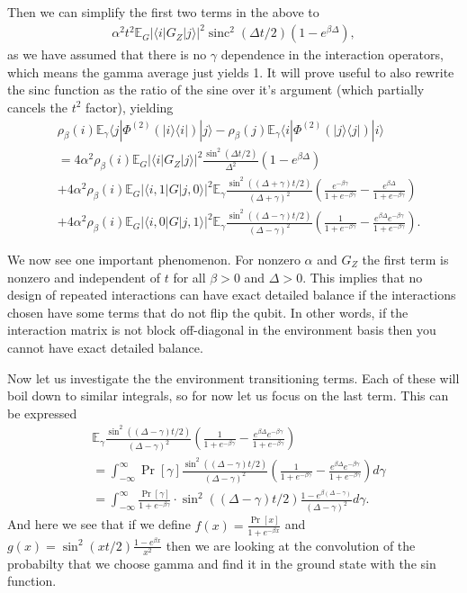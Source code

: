 \documentclass[
 amsmath,amssymb,
 aps,
onecolumn, 
nofootinbib]{revtex4-2}
\newcommand{\ket}[1]{|#1\rangle}
\newcommand{\bra}[1]{\langle #1|}
\newcommand{\ketbra}[2]{| #1\rangle\! \langle #2|}
\newcommand{\abs}[1]{\left| #1 \right|}
\newcommand{\EE}{\mathbb{E}}
\DeclareMathOperator{\sinc}{sinc}
\begin{document}
Then we can simplify the first two terms in the above to
\begin{align}
    \alpha^2 t^2 \EE_G \abs{\bra{i} G_Z \ket{j}}^2 \sinc^2 (\Delta t /2) (1 - e^{\beta \Delta}),
\end{align}
as we have assumed that there is no $\gamma$ dependence in the interaction operators, which means the gamma average just yields 1. It will prove useful to also rewrite the sinc function as the ratio of the sine over it's argument (which partially cancels the $t^2$ factor), yielding
\begin{align}
    &\rho_{\beta}(i) \EE_\gamma \bra{j} \Phi^{(2)}(\ketbra{i}{i}) \ket{j} - \rho_{\beta}(j)\EE_\gamma \bra{i} \Phi^{(2)}(\ketbra{j}{j}) \ket{i} \nonumber \\
    &= 4\alpha^2 \rho_{\beta}(i) \EE_G \abs{\bra{i} G_Z \ket{j}}^2 \frac{\sin^2(\Delta t /2)}{\Delta^2} (1 - e^{\beta \Delta}) \\
    &+ 4 \alpha^2 \rho_{\beta}(i) \EE_G  \abs{\bra{i, 1} G \ket{j, 0}}^2 \EE_\gamma \frac{\sin^2((\Delta + \gamma) t /2)}{(\Delta + \gamma)^2} \left(\frac{e^{-\beta \gamma}}{ 1 + e^{-\beta \gamma}} - \frac{e^{\beta \Delta}}{1 + e^{-\beta \gamma}} \right) \\
    &+ 4\alpha^2 \rho_{\beta}(i) \EE_G  \abs{\bra{i, 0} G \ket{j, 1}}^2 \EE_\gamma \frac{\sin^2((\Delta - \gamma) t /2)}{(\Delta - \gamma)^2} \left(\frac{1}{ 1 + e^{-\beta \gamma}} - \frac{e^{\beta \Delta} e^{-\beta \gamma}}{1 + e^{-\beta \gamma}} \right).
\end{align}

We now see one important phenomenon. For nonzero $\alpha$ and $G_Z$ the first term is nonzero and independent of $t$ for all $\beta > 0$ and $\Delta >0$. This implies that no design of repeated interactions can have exact detailed balance if the interactions chosen have some terms that do not flip the qubit. In other words, if the interaction matrix is not block off-diagonal in the environment basis then you cannot have exact detailed balance. 

Now let us investigate the the environment transitioning terms. Each of these will boil down to similar integrals, so for now let us focus on the last term. This can be expressed
\begin{align}
    &\EE_\gamma \frac{\sin^2((\Delta - \gamma) t /2)}{(\Delta - \gamma)^2} \left(\frac{1}{ 1 + e^{-\beta \gamma}} - \frac{e^{\beta \Delta} e^{-\beta \gamma}}{1 + e^{-\beta \gamma}} \right) \\
    &= \int_{-\infty}^{\infty} \Pr[\gamma] \frac{\sin^2((\Delta - \gamma) t /2)}{(\Delta - \gamma)^2} \left(\frac{1}{ 1 + e^{-\beta \gamma}} - \frac{e^{\beta \Delta} e^{-\beta \gamma}}{1 + e^{-\beta \gamma}} \right) d\gamma \\
    &= \int_{-\infty}^{\infty} \frac{\Pr[\gamma]}{1 + e^{-\beta \gamma} } \cdot \sin^2 ((\Delta - \gamma) t/2) \frac{1 - e^{\beta (\Delta - \gamma)}}{(\Delta - \gamma)^2} d\gamma.
\end{align}
And here we see that if we define $f(x) = \frac{\Pr[x]}{1 + e^{-\beta x} }$ and $g(x) = \sin^2 (x t/2) \frac{1 - e^{\beta x}}{x^2}$ then we are looking at the convolution of the probabilty that we choose gamma and find it in the ground state with the sin function. 
\end{document}
